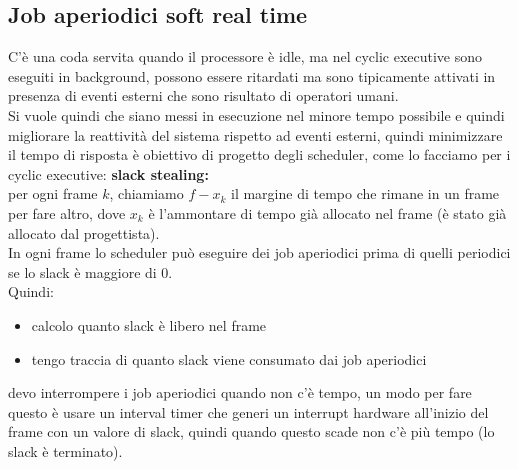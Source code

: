 \documentclass[12pt, oneside]{extbook}
\begin{document}
\subsection{Job aperiodici soft real time}
C'è una coda servita quando il processore è idle, ma nel cyclic executive sono eseguiti in background, possono essere ritardati ma sono tipicamente attivati in presenza di eventi esterni che sono risultato di operatori umani.\\
Si vuole quindi che siano messi in esecuzione nel minore tempo possibile e quindi migliorare la reattività del sistema rispetto ad eventi esterni, quindi minimizzare il tempo di risposta è obiettivo di progetto degli scheduler, come lo facciamo per i cyclic executive: \textbf{slack stealing:}\\per ogni frame $k$, chiamiamo $f - x_k$ il margine di tempo che rimane in un frame per fare altro, dove $x_k$ è l'ammontare di tempo già allocato nel frame (è stato già allocato dal progettista).\\
In ogni frame lo scheduler può eseguire dei job aperiodici prima di quelli periodici se lo slack è maggiore di 0.\\
Quindi:
\begin{itemize}
	\item calcolo quanto slack è libero nel frame
	\item tengo traccia di quanto slack viene consumato dai job aperiodici
\end{itemize}
devo interrompere i job aperiodici quando non c'è tempo, un modo per fare questo è usare un interval timer che generi un interrupt hardware all'inizio del frame con un valore di slack, quindi quando questo scade non c'è più tempo (lo slack è terminato).\\\\
\end{document}
